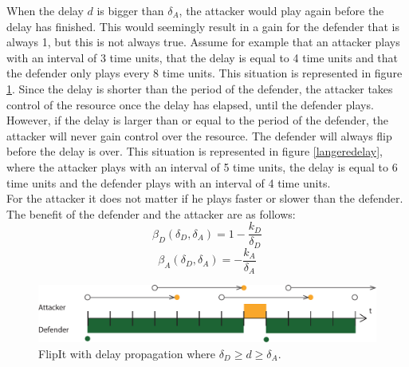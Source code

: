 When the delay $d$ is bigger than $\delta_{A}$, the attacker would play again before the delay has finished. This would seemingly result in a gain for the defender that is always 1, but this is not always true. Assume for example that an attacker plays with an interval of 3 time units, that the delay is equal to 4 time units and that the defender only plays every 8 time units. This situation is represented in figure \ref{langedelay}. Since the delay is shorter than the period of the defender, the attacker takes control of the resource once the delay has elapsed, until the defender plays.\\

However, if the delay is larger than or equal to the period of the defender, the attacker will never gain control over the resource. The defender will always flip before the delay is over. This situation is represented in figure \ref{langeredelay}, where the attacker plays with an interval of 5 time units, the delay is equal to 6 time units and the defender plays with an interval of 4 time units. \\
For the attacker it does not matter if he plays faster or slower than the defender. The benefit of the defender and the attacker are as follows:
\begin{equation}\label{case0def}
\beta_{D}(\delta_{D},\delta_{A})=1-\dfrac{k_{D}}{\delta_{D}}
\end{equation}
\begin{equation}\label{case0att}
\beta_{A}(\delta_{D},\delta_{A})=-\dfrac{k_{A}}{\delta_{A}}
\end{equation}




\begin{figure}[hbtp]
\centering
\includegraphics[scale=0.7]{Images/FlipItCase1delay.pdf} 
\caption{FlipIt with delay propagation where $\delta_{D} \geq d \geq \delta_{A}$.   }
\label{langedelay}
\end{figure}


